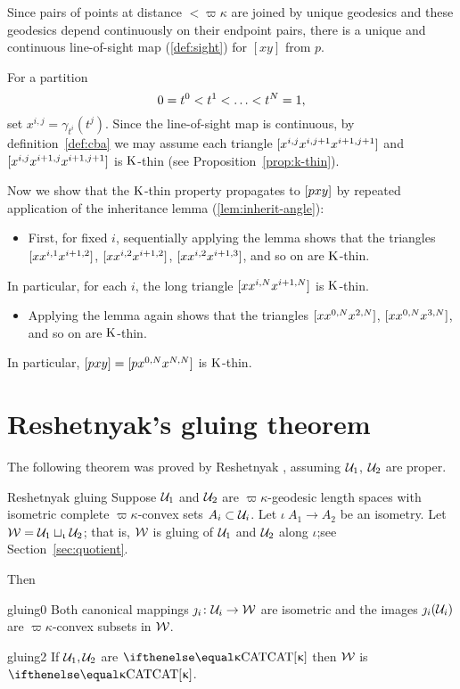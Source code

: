 Since pairs of points at distance $<\varpi\kappa$ are joined by unique geodesics and these geodesics depend continuously on their endpoint pairs, there is a unique and continuous line-of-sight map (\ref{def:sight}) for  $[x y]$ from $p$.    

For a partition \[0\z=t^0\z<t^1\z<\z\dots\z<t^N=1,\] 
set $x^{i,j}=\gamma_{t^i}(t^j)$. 
Since the line-of-sight map is continuous, 
by definition~\ref{def:cba} we may assume each triangle $[{x^{i,j}}{x^{i,j+1}}{x^{i+1,j+1}}]$ and $[{x^{i,j}}{x^{i+1,j}}{x^{i+1,j+1}}]$ is $\mathrm{K}$-thin 
(see Proposition~\ref{prop:k-thin}).

Now we show that the $\mathrm{K}$-thin property propagates to $[{p}{x}{y}]$ by repeated application of the inheritance lemma (\ref{lem:inherit-angle}):
\begin{itemize}
\item 
First, for fixed $i$, 
sequentially applying the lemma shows  that the triangles 
$[{x}{x^{i,1}}{x^{i+1,2}}]$, 
$[{x}{x^{i,2}}{x^{i+1,2}}]$, 
$[{x}{x^{i,2}}{x^{i+1,3}}]$,
and so on are $\mathrm{K}$-thin. 
\end{itemize}
In particular, for each $i$, the long triangle $[{x}{x^{i,N}}{x^{i+1,N}}]$ is $\mathrm{K}$-thin.
\begin{itemize} 
\item 
Applying the lemma again shows that the  triangles $[{x}{x^{0,N}}{x^{2,N}}]$, $[{x}{x^{0,N}}{x^{3,N}}]$, and so on are $\mathrm{K}$-thin. 
\end{itemize}
In particular, $[{p}{x}{y}]=[{p}{x^{0,N}}{x^{N,N}}]$ is $\mathrm{K}$-thin.
\qeds

\section{Reshetnyak's gluing theorem}\label{sec:cba-gluing}

The following theorem was proved by Reshetnyak \cite{reshetnyak:glue},  assuming $\mathcal{U}_1$, $\mathcal{U}_2$ are proper.

\begin{thm}{Reshetnyak gluing}\label{thm:gluing}
Suppose 
$\mathcal{U}_1$ and $\mathcal{U}_2$ are $\varpi\kappa$-geodesic length spaces 
with isometric complete $\varpi\kappa$-convex sets $A_i\subset\spc{U}_i$.  Let $\iota\:A_1\to A_2$ be an isometry.
Let $\mathcal{W}=\mathcal{U}_1\sqcup_{\upiota}\mathcal{U}_2$;
that is, $\mathcal{W}$ is gluing of $\mathcal{U}_1$ and  $\mathcal{U}_2$ along $\iota$;see Section~\ref{sec:quotient}.

Then 
\begin{subthm}{gluing0}
Both canonical mappings $\jmath_i\:\spc{U}_i\to\spc{W}$ are isometric 
and the images $\jmath_i(\mathcal{U}_i)$ are $\varpi\kappa$-convex subsets in $\mathcal{W}$.
\end{subthm}

\begin{subthm}{gluing2}
If $\mathcal{U}_1, \mathcal{U}_2$ are $\CAT\kappa$ 
then $\mathcal{W}$ is $\CAT\kappa$.
\end{subthm} 
\end{thm}

